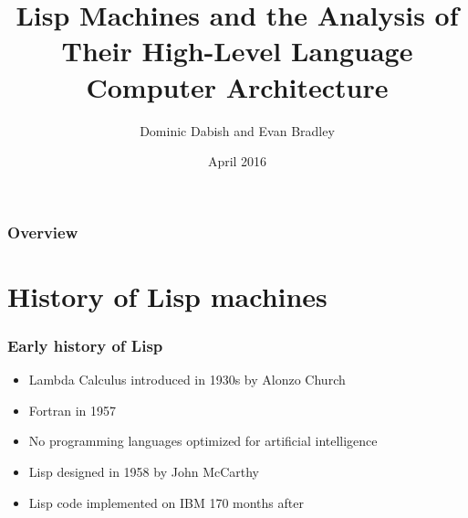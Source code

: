 \documentclass{beamer}
\title[Lisp machines]{Lisp Machines and the Analysis of Their High-Level Language Computer Architecture} %
\author{Dominic Dabish and Evan Bradley} %
\institute[OU] %
{
Oakland University \\ %
\medskip
\textit{\{dadabish, edbradley\}@oakland.edu} %
}
\date{April 2016} %
\begin{document}
\begin{frame}
\titlepage %
\end{frame}

\begin{frame}
\frametitle{Overview} %
\tableofcontents %
\end{frame}


\section{History of Lisp machines} %



\begin{frame}
	\frametitle{Early history of Lisp}
	\begin{itemize}
		\item Lambda Calculus introduced in 1930s by Alonzo Church
		\newline
		\item Fortran in 1957
		\newline
		\item No programming languages optimized for artificial intelligence
		\newline
		\item Lisp designed in 1958 by John McCarthy
		\newline
		\item Lisp code implemented on IBM 170 months after
		\newline
	\end{itemize}
\end{frame}
\end{document}
